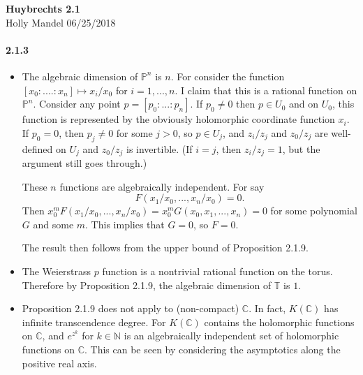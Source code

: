 \documentclass[10pt,letter]{article}
\begin{document}
\begin{center} 
{\bf Huybrechts 2.1} \\
Holly Mandel 06/25/2018
\end{center}

\paragraph*{2.1.3}
\begin{itemize}
\item The algebraic dimension of $\mathbb{P}^n$ is $n$. For consider the function $[x_0: .... : x_n] \mapsto x_i/x_0$ for $i = 1,...,n$. I claim that this is a rational function on $\mathbb{P}^n$. Consider any point $p = [p_0:...:p_n]$. If $p_0 \neq 0$ then $p \in U_0$ and on $U_0$, this function is represented by the obviously holomorphic coordinate function $x_i$. If $p_0 = 0$, then $p_j \neq 0$ for some $j > 0$, so $p \in U_j$, and $z_i/z_j$ and $z_0/z_j$ are well-defined on $U_j$ and $z_0/z_j$ is invertible. (If $i = j$, then $z_i/z_j = 1$, but the argument still goes through.) 

These $n$ functions are algebraically independent. For say \[ F(x_1/x_0,...,x_n/x_0) = 0.\] Then $x_0^m F(x_1/x_0,...,x_n/x_0) = x_0^m G(x_0,x_1,...,x_n) = 0$ for some polynomial $G$ and some $m$. This implies that $G = 0$, so $F = 0$. 

The result then follows from the upper bound of Proposition 2.1.9.
 
\item The Weierstrass $p$ function is a nontrivial rational function on the torus. Therefore by Proposition 2.1.9, the algebraic dimension of $\mathbb{T}$ is $1$. 

\item Proposition 2.1.9 does not apply to (non-compact) $\mathbb{C}$. In fact, $K(\mathbb{C})$ has infinite transcendence degree. For $K(\mathbb{C})$ contains the holomorphic functions on $\mathbb{C}$, and $e^{z^k}$ for $k \in \mathbb{N}$ is an algebraically independent set of holomorphic functions on $\mathbb{C}$. This can be seen by considering the asymptotics along the positive real axis. 
\end{itemize}
\end{document}
